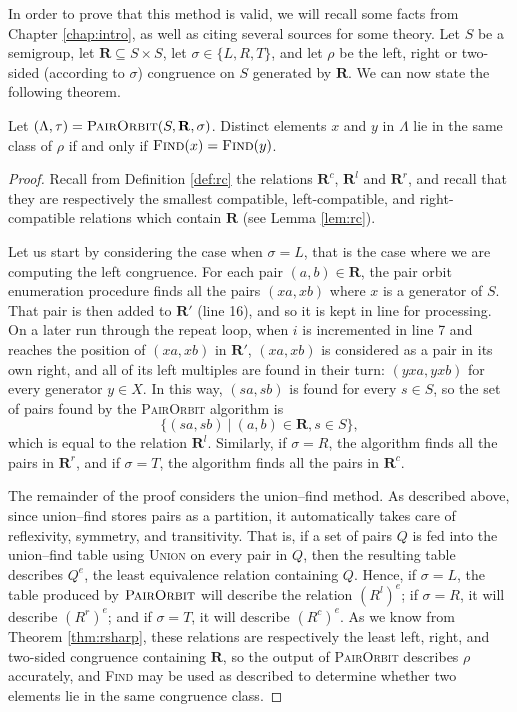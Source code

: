 In order to prove that this method is valid, we will recall some facts from
Chapter \ref{chap:intro}, as well as citing several sources for some theory.
Let $S$ be a semigroup, let $\mathbf{R} \subseteq S \times S$, let
$\sigma \in \{L, R, T\}$, and let $\rho$ be the left, right or two-sided
(according to $\sigma$) congruence on $S$ generated by $\mathbf{R}$.  We can now
state the following theorem.

\begin{theorem}
  \label{thm:p}
  Let $(\Lambda, \tau) = \textsc{PairOrbit}(S, \mathbf{R}, \sigma)$.  Distinct elements
  $x$ and $y$ in $\Lambda$ lie in the same class of $\rho$ if and only if
  $\textsc{Find}(x) = \textsc{Find}(y)$.
  \begin{proof}
    Recall from Definition \ref{def:rc} the relations $\mathbf{R}^c$,
    $\mathbf{R}^l$ and $\mathbf{R}^r$, and recall that they are respectively the
    smallest compatible, left-compatible, and right-compatible relations which
    contain $\mathbf{R}$ (see Lemma \ref{lem:rc}).

    Let us start by considering the case when $\sigma = L$, that is the case
    where we are computing the left congruence.  For each pair
    $(a,b) \in \mathbf{R}$, the pair orbit enumeration procedure finds all the
    pairs $(xa, xb)$ where $x$ is a generator of $S$.  That pair is then added
    to $\mathbf{R}'$ (line 16), and so it is kept in line for processing.  On a
    later run through the repeat loop, when $i$ is incremented in line 7 and
    reaches the position of $(xa, xb)$ in $\mathbf{R}'$, $(xa, xb)$ is
    considered as a pair in its own right, and all of its left multiples are
    found in their turn: $(yxa, yxb)$ for every generator $y \in X$.  In this
    way, $(sa, sb)$ is found for every
    $s \in S$, so the set of pairs found by the \textsc{PairOrbit} algorithm is
    $$\{(sa, sb) ~|~ (a,b) \in \mathbf{R}, s \in S\},$$
    which is equal to the relation $\mathbf{R}^l$.
    Similarly, if $\sigma = R$, the algorithm finds all the pairs in
    $\mathbf{R}^r$, and if $\sigma = T$, the algorithm finds all the pairs in
    $\mathbf{R}^c$.

    The remainder of the proof considers the union--find method.  As described
    above, since union--find stores pairs as a partition, it automatically takes
    care of reflexivity, symmetry, and transitivity.  That is, if a set of pairs
    $Q$ is fed into the union--find table using \textsc{Union} on every pair in
    $Q$, then the resulting table describes $Q^e$, the least equivalence
    relation containing $Q$.  Hence, if $\sigma = L$, the table produced by
    $\textsc{PairOrbit}$ will describe the relation $(R^l)^e$; if $\sigma = R$, it will
    describe $(R^r)^e$; and if $\sigma = T$, it will describe $(R^c)^e$.  As we
    know from Theorem \ref{thm:rsharp}, these relations are respectively the least
    left, right, and two-sided congruence containing $\mathbf{R}$, so the output
    of \textsc{PairOrbit} describes $\rho$ accurately, and \textsc{Find} may be used as
    described to determine whether two elements lie in the same congruence class.
  \end{proof}
\end{theorem}

